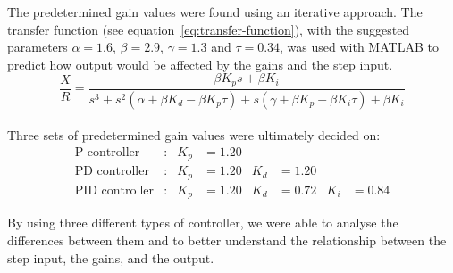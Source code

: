 \documentclass[12pt]{article} %
\begin{document}
\noindent The predetermined gain values were found using an iterative approach. The transfer function (see equation\ \ref{eq:transfer-function}), with the suggested parameters $\alpha = 1.6$, $\beta = 2.9$, $\gamma = 1.3$ and $\tau = 0.34$, was used with MATLAB to predict how output would be affected by the gains and the step input.
\\ 

\begin{equation}
\label{eq:transfer-function}
\frac{X}{R} = \frac{\beta K_p s + \beta K_i}{s^3 + s^2 (\alpha + \beta K_d - \beta K_p \tau) + s(\gamma + \beta K_p - \beta K_i \tau) + \beta K_i}
\end{equation}
\\ 

\noindent Three sets of predetermined gain values were ultimately decided on:
\begin{align*}
\textrm{P controller} &: & K_p &= 1.20 & & & \\[1em]
\textrm{PD controller} &: & K_p &= 1.20 & K_d &= 1.20 & & \\[1em]
\textrm{PID controller} &: & K_p &= 1.20 & K_d &= 0.72 & K_i &= 0.84
\end{align*}

\noindent By using three different types of controller, we were able to analyse the differences between them and to better understand the relationship between the step input, the gains, and the output.
\\ 
\end{document}
